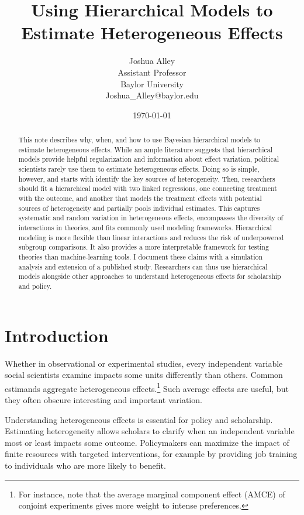 \documentclass[12pt]{article}
\title{\textbf{Using Hierarchical Models to Estimate Heterogeneous Effects}}
\author{Joshua Alley \\
Assistant Professor \\
Baylor University \\
Joshua\_Alley@baylor.edu
}
\date{\today}
\begin{document}
\maketitle 

\begin{abstract} 
This note describes why, when, and how to use Bayesian hierarchical models to estimate heterogeneous effects. 
While an ample literature suggests that hierarchical models provide helpful regularization and information about effect variation, political scientists rarely use them to estimate heterogeneous effects. 
Doing so is simple, however, and starts with identify the key sources of heterogeneity. 
Then, researchers should fit a hierarchical model with two linked regressions, one connecting treatment with the outcome, and another that models the treatment effects with potential sources of heterogeneity and partially pools individual estimates.
This captures systematic and random variation in heterogeneous effects, encompasses the diversity of interactions in theories, and fits commonly used modeling frameworks. 
Hierarchical modeling is more flexible than linear interactions and reduces the risk of underpowered subgroup comparisons.
It also provides a more interpretable framework for testing theories than machine-learning tools. 
I document these claims with a simulation analysis and extension of a published study. 
Researchers can thus use hierarchical models alongside other approaches to understand heterogeneous effects for scholarship and policy.
\end{abstract} 


\newpage 
\doublespace 


\section{Introduction}


Whether in observational or experimental studies, every independent variable social scientists examine impacts some units differently than others. 
Common estimands aggregate heterogeneous effects.\footnote{For instance, \citet{Abramsonetal2022} note that the average marginal component effect (AMCE) of conjoint experiments gives more weight to intense preferences.} 
Such average effects are useful, but they often obscure interesting and important variation. 


Understanding heterogeneous effects is essential for policy and scholarship. 
Estimating heterogeneity allows scholars to clarify when an independent variable most or least impacts some outcome.
Policymakers can maximize the impact of finite resources with targeted interventions, for example by providing job training to individuals who are more likely to benefit. 
\end{document}

